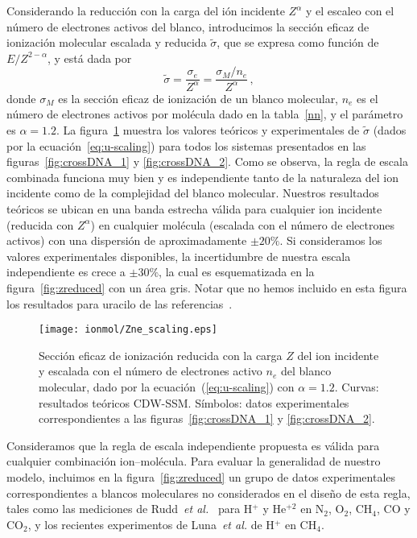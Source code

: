 Considerando la reducción con la carga del ión incidente $Z^\alpha$ y el 
escaleo con el número de electrones activos del blanco, introducimos 
la sección eficaz de ionización molecular escalada y reducida 
$\tilde{\sigma}$, que se expresa como función de $E/Z^{2-\alpha}$, y
está dada por
\begin{equation}
 \tilde{\sigma}=\frac{\sigma_e}{Z^{\alpha}}=\frac{\sigma_M/n_e}{Z^{\alpha}}\,,
\label{eq:u-scaling}
\end{equation}
donde $\sigma_M$ es la sección eficaz de ionización de un blanco 
molecular, $n_e$ es el número de electrones activos por molécula dado
en la tabla~\ref{nn}, y el parámetro es $\alpha=1.2$. La 
figura~\ref{fig:zalpha} muestra los valores teóricos y experimentales
de $\tilde{\sigma}$ (dados por la ecuación~\ref{eq:u-scaling}) para todos 
los sistemas presentados en las figuras~\ref{fig:crossDNA_1} y 
\ref{fig:crossDNA_2}. Como se observa, la regla de escala combinada 
funciona muy bien y es independiente tanto de la naturaleza del ion 
incidente como de la complejidad del blanco molecular. Nuestros 
resultados teóricos se ubican en una banda estrecha válida para cualquier
ion incidente (reducida con $Z^\alpha$) en cualquier molécula
(escalada con el número de electrones activos) con una dispersión de 
aproximadamente $\pm 20\%$. Si consideramos los valores experimentales
disponibles, la incertidumbre de nuestra escala independiente es 
crece a $\pm 30\%$, la cual es esquematizada en la 
figura~\ref{fig:zreduced} con un área gris. Notar que no hemos incluido 
en esta figura los resultados para uracilo de las 
referencias~\cite{agnihotri2012,agnihotri2013}. 

\begin{figure}[t]
\centering
\texttt{[image: ionmol/Zne\_scaling.eps]}
\caption[Sección eficaz de ionización reducida por $Z$ y $n_e$.]
{Sección eficaz de ionización reducida con la carga $Z$ del ion incidente
y escalada con el número de electrones activo $n_e$ del blanco molecular,
dado por la ecuación~(\ref{eq:u-scaling}) con $\alpha=1.2$. 
Curvas: resultados teóricos CDW-SSM. 
Símbolos: datos experimentales correspondientes a las 
figuras~\ref{fig:crossDNA_1} y \ref{fig:crossDNA_2}.}
\label{fig:zalpha}
\end{figure} 

Consideramos que la regla de escala independiente propuesta es válida 
para cualquier combinación ion--molécula. Para evaluar la generalidad 
de nuestro modelo, incluimos en la figura~\ref{fig:zreduced} un grupo 
de datos experimentales correspondientes a blancos moleculares no 
considerados en el diseño de esta regla, tales como las mediciones de
Rudd~\textit{et al.}~\cite{Rudd:85,Rudd:83} para H$^{+}$ y He$^{+2}$ 
en N$_2$, O$_2$, CH$_4$, CO y CO$_2$, y los recientes experimentos de
Luna~\textit{et al.} \cite{Luna2019} de H$^{+}$ en CH$_4$. 

